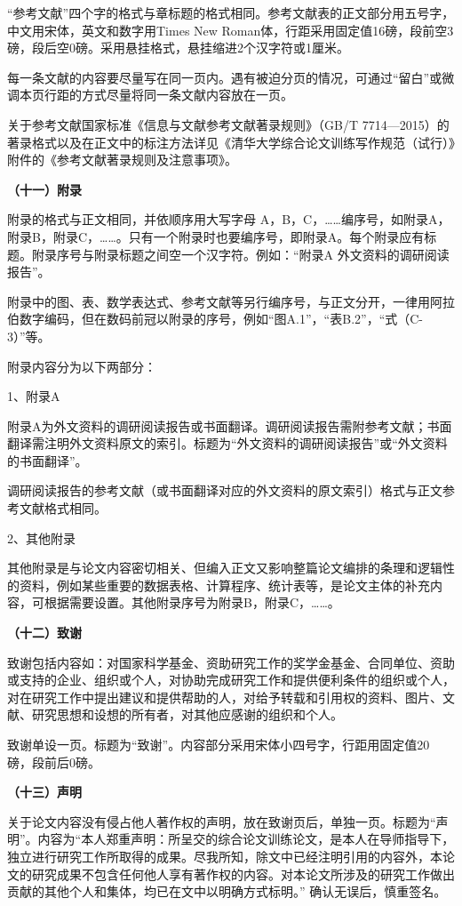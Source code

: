 \documentclass{Diploma}
\begin{document}
“参考文献”四个字的格式与章标题的格式相同。参考文献表的正文部分用五号字，中文用宋体，英文和数字用Times New Roman体，行距采用固定值16磅，段前空3磅，段后空0磅。采用悬挂格式，悬挂缩进2个汉字符或1厘米。

每一条文献的内容要尽量写在同一页内。遇有被迫分页的情况，可通过“留白”或微调本页行距的方式尽量将同一条文献内容放在一页。

关于参考文献国家标准《信息与文献参考文献著录规则》（GB/T 7714—2015）的著录格式以及在正文中的标注方法详见《清华大学综合论文训练写作规范（试行）》附件的《参考文献著录规则及注意事项》。

\noindent\textbf{（十一）附录}

附录的格式与正文相同，并依顺序用大写字母 A，B，C，……编序号，如附录A，附录B，附录C，……。只有一个附录时也要编序号，即附录A。每个附录应有标题。附录序号与附录标题之间空一个汉字符。例如：“附录A 外文资料的调研阅读报告”。

附录中的图、表、数学表达式、参考文献等另行编序号，与正文分开，一律用阿拉伯数字编码，但在数码前冠以附录的序号，例如“图A.1”，“表B.2”，“式（C-3）”等。

附录内容分为以下两部分：

1、附录A

附录A为外文资料的调研阅读报告或书面翻译。调研阅读报告需附参考文献；书面翻译需注明外文资料原文的索引。标题为“外文资料的调研阅读报告”或“外文资料的书面翻译”。

调研阅读报告的参考文献（或书面翻译对应的外文资料的原文索引）格式与正文参考文献格式相同。

2、其他附录

其他附录是与论文内容密切相关、但编入正文又影响整篇论文编排的条理和逻辑性的资料，例如某些重要的数据表格、计算程序、统计表等，是论文主体的补充内容，可根据需要设置。其他附录序号为附录B，附录C，……。

\noindent\textbf{（十二）致谢}

致谢包括内容如：对国家科学基金、资助研究工作的奖学金基金、合同单位、资助或支持的企业、组织或个人，对协助完成研究工作和提供便利条件的组织或个人，对在研究工作中提出建议和提供帮助的人，对给予转载和引用权的资料、图片、文献、研究思想和设想的所有者，对其他应感谢的组织和个人。

致谢单设一页。标题为“致谢”。内容部分采用宋体小四号字，行距用固定值20 磅，段前后0磅。

\noindent\textbf{（十三）声明}

关于论文内容没有侵占他人著作权的声明，放在致谢页后，单独一页。标题为“声明”。内容为“本人郑重声明：所呈交的综合论文训练论文，是本人在导师指导下，独立进行研究工作所取得的成果。尽我所知，除文中已经注明引用的内容外，本论文的研究成果不包含任何他人享有著作权的内容。对本论文所涉及的研究工作做出贡献的其他个人和集体，均已在文中以明确方式标明。” 确认无误后，慎重签名。
\end{document}
